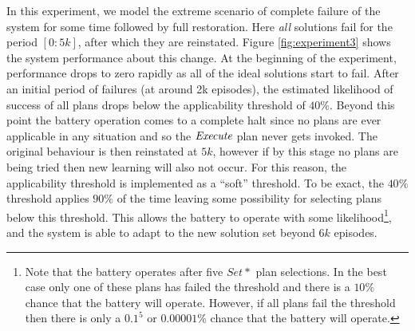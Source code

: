 In this experiment, we model the extreme scenario of complete failure of the system for some time followed by full restoration. Here {\em all} solutions fail for the period $[0:5k]$, after which they are reinstated. Figure \ref{fig:experiment3} shows the system performance about this change. At the beginning of the experiment, performance drops to zero rapidly as all of the ideal solutions start to fail. After an initial period of failures (at around 2k episodes), the estimated likelihood of success of all plans drops below the applicability threshold of $40\%$. Beyond this point the battery operation comes to a complete halt since no plans are ever applicable in any situation and so the $\operatorname{\textit{Execute}}$ plan never gets invoked. The original behaviour is then reinstated at $5k$, however if by this stage no plans are being tried then new learning will also not occur. For this reason, the applicability threshold is implemented as a ``soft'' threshold. To be exact, the $40\%$ threshold applies $90\%$ of the time leaving some possibility for selecting plans below this threshold. This allows the battery to operate with some likelihood\footnote{Note that the battery operates after five $Set*$ plan selections. In the best case only one of these plans has failed the threshold and there is a $10\%$ chance that the battery will operate. However, if all plans fail the threshold then there is only a $0.1^5$ or $0.00001\%$ chance that the battery will operate.}, and the system is able to adapt to the new solution set beyond $6k$ episodes.


%
